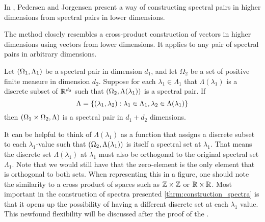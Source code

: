\documentclass[../thesis.tex]{subfiles}
\begin{document}
In \cite{jorgensenSpectralPairsCartesian2001}, Pedersen and Jorgensen present a way of constructing spectral pairs in higher dimensions from spectral pairs in lower dimensions. 

The method closely resembles a cross-product construction of vectors in higher dimensions using vectors from lower dimensions. It applies to any pair of spectral pairs in arbitrary dimensions.  %
\begin{theorem}\label{thrm:construction_spectra}
    Let $(\Omega_1,\Lambda_1)$ be a spectral pair in dimension $d_1$, and let $\Omega_2$ be a set of positive finite measure in dimension $d_2$. Suppose for each $\lambda_1 \in \Lambda_1$ that $\Lambda(\lambda_1)$ is a discrete subset of $\mathbb{R}^{d_2}$ such that $(\Omega_2,\Lambda(\lambda_1))$ is a spectral pair. If 
    \begin{equation*}
        \Lambda = \{(\lambda_1, \lambda_2): \lambda_1\in \Lambda_1, \lambda_2 \in \Lambda(\lambda_1)\} 
    \end{equation*}
    then $(\Omega_1\times\Omega_2, \Lambda)$ is a spectral pair in $d_1+d_2$ dimensions. 
\end{theorem}

\begin{remark}
    It can be helpful to think of $\Lambda(\lambda_1)$ as a function that assigns a discrete subset to each $\lambda_1$-value such that $(\Omega_2,\Lambda(\lambda_1))$ is itself a spectral set at $\lambda_1$. That means the discrete set $\Lambda(\lambda_1)$ at $\lambda_1$ must also be orthogonal to the original spectral set $\Lambda_1$. Note that we would still have that the zero-element is the only element that is orthogonal to both sets. When representing this in a figure, one should note the similarity to a cross product of spaces such as $\mathbb{Z} \times \mathbb{Z}$ or $\mathbb{R} \times \mathbb{R}$. Most important in the construction of spectra presented \cref{thrm:construction_spectra} is that it opens up the possibility of having a different discrete set at each $\lambda_1$ value. This newfound flexibility will be discussed after the proof of the .
\end{remark}
\end{document}
